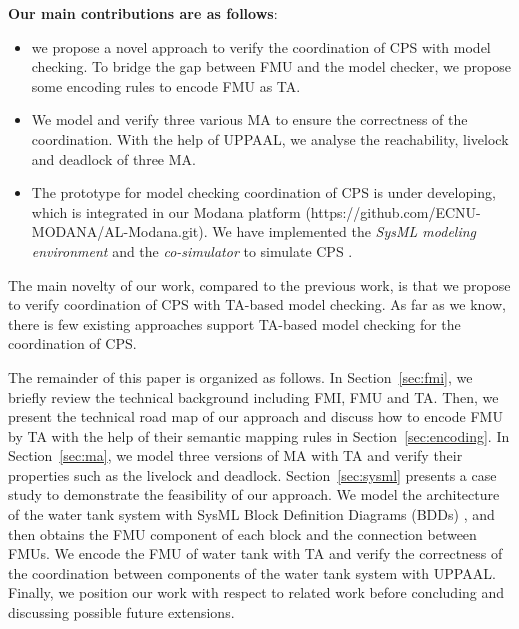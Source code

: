 \textbf{Our main contributions are as follows}:
\begin{itemize}
\item
we propose a novel approach to verify the coordination of CPS with model checking. To bridge the gap between FMU and the model checker, we propose some encoding rules to encode FMU as TA.
\item
We model and verify three various MA to ensure the correctness of the coordination. With the help of UPPAAL, we analyse the reachability, livelock and deadlock of three MA.
\item
The prototype for model checking coordination of CPS is under developing, which is integrated in our Modana platform \cite{Cheng2015Modana}(https://github.com/ECNU-MODANA/AL-Modana.git). We have implemented the \textit{SysML modeling environment} and the \textit{co-simulator} to simulate CPS \cite{Fritzson1998Modelica}.
\end{itemize}
The main novelty of our work, compared to the previous work, is that we propose to verify coordination of CPS with TA-based model checking. As far as we know, there is few existing approaches support TA-based model checking for the coordination of CPS.

The remainder of this paper is organized as follows. In Section~\ref{sec:fmi}, we briefly review the technical background including FMI, FMU and TA. Then, we present the technical road map of our approach and discuss how to encode FMU by TA with the help of their semantic mapping rules in Section~\ref{sec:encoding}. In Section~\ref{sec:ma}, we model three versions of MA with TA and verify their properties such as the livelock and deadlock. Section~\ref{sec:sysml} presents a case study to demonstrate the feasibility of our approach. We model the architecture of the water tank system with SysML Block Definition Diagrams (BDDs) \cite{SemerathBHSV17}, and then obtains the FMU component of each block and the connection between FMUs. We encode the FMU of water tank with TA and verify the correctness of the coordination between components of the water tank system with UPPAAL. Finally, we position our work with respect to related work before concluding and discussing possible future extensions.




















